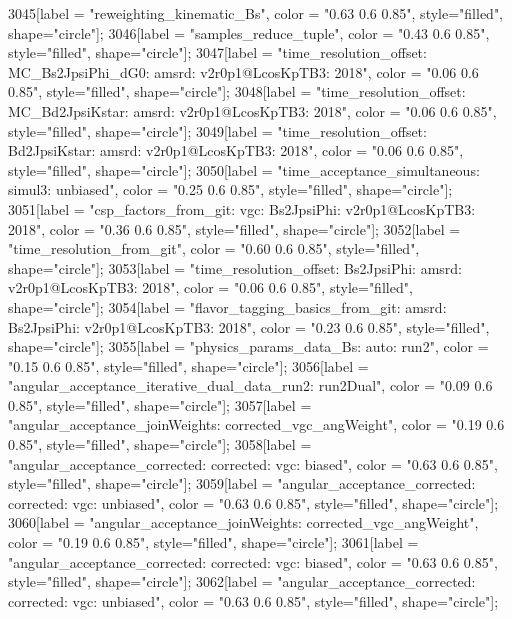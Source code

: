 {	3045[label = "reweighting_kinematic_Bs", color = "0.63 0.6 0.85", style="filled", shape="circle"];
	3046[label = "samples_reduce_tuple", color = "0.43 0.6 0.85", style="filled", shape="circle"];
	3047[label = "time_resolution_offset\nmode: MC_Bs2JpsiPhi_dG0\ntimeres: amsrd\nversion: v2r0p1@LcosKpTB3\nyear: 2018", color = "0.06 0.6 0.85", style="filled", shape="circle"];
	3048[label = "time_resolution_offset\nmode: MC_Bd2JpsiKstar\ntimeres: amsrd\nversion: v2r0p1@LcosKpTB3\nyear: 2018", color = "0.06 0.6 0.85", style="filled", shape="circle"];
	3049[label = "time_resolution_offset\nmode: Bd2JpsiKstar\ntimeres: amsrd\nversion: v2r0p1@LcosKpTB3\nyear: 2018", color = "0.06 0.6 0.85", style="filled", shape="circle"];
	3050[label = "time_acceptance_simultaneous\ntimeacc: simul3\ntrigger: unbiased", color = "0.25 0.6 0.85", style="filled", shape="circle"];
	3051[label = "csp_factors_from_git\ncsp: vgc\nmode: Bs2JpsiPhi\nversion: v2r0p1@LcosKpTB3\nyear: 2018", color = "0.36 0.6 0.85", style="filled", shape="circle"];
	3052[label = "time_resolution_from_git", color = "0.60 0.6 0.85", style="filled", shape="circle"];
	3053[label = "time_resolution_offset\nmode: Bs2JpsiPhi\ntimeres: amsrd\nversion: v2r0p1@LcosKpTB3\nyear: 2018", color = "0.06 0.6 0.85", style="filled", shape="circle"];
	3054[label = "flavor_tagging_basics_from_git\nflavor: amsrd\nmode: Bs2JpsiPhi\nversion: v2r0p1@LcosKpTB3\nyear: 2018", color = "0.23 0.6 0.85", style="filled", shape="circle"];
	3055[label = "physics_params_data_Bs\nfit: auto\nyear: run2", color = "0.15 0.6 0.85", style="filled", shape="circle"];
	3056[label = "angular_acceptance_iterative_dual_data_run2\nangacc: run2Dual", color = "0.09 0.6 0.85", style="filled", shape="circle"];
	3057[label = "angular_acceptance_joinWeights\nwflag: corrected_vgc_angWeight", color = "0.19 0.6 0.85", style="filled", shape="circle"];
	3058[label = "angular_acceptance_corrected\nangacc: corrected\ncsp: vgc\ntrigger: biased", color = "0.63 0.6 0.85", style="filled", shape="circle"];
	3059[label = "angular_acceptance_corrected\nangacc: corrected\ncsp: vgc\ntrigger: unbiased", color = "0.63 0.6 0.85", style="filled", shape="circle"];
	3060[label = "angular_acceptance_joinWeights\nwflag: corrected_vgc_angWeight", color = "0.19 0.6 0.85", style="filled", shape="circle"];
	3061[label = "angular_acceptance_corrected\nangacc: corrected\ncsp: vgc\ntrigger: biased", color = "0.63 0.6 0.85", style="filled", shape="circle"];
	3062[label = "angular_acceptance_corrected\nangacc: corrected\ncsp: vgc\ntrigger: unbiased", color = "0.63 0.6 0.85", style="filled", shape="circle"];
}
